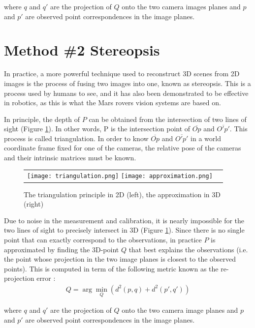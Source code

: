 \documentclass[twoside]{article}
\begin{document}
where $q$ and $q'$ are the projection of $Q$ onto the two camera images planes and $p$ and $p'$ are observed point correspondences in the image planes.
\section{Method \#2 Stereopsis}

In practice, a more powerful technique used to reconstruct 3D scenes from 2D images is the process of fusing two images into one, known as stereopsis. This is a process used by humans to see, and it has also been demonstrated to be effective in robotics, as this is what the Mars rovers vision systems are based on.

In principle, the depth of $P$ can be obtained from the intersection of two lines of sight (Figure \ref{triangle}). In other words, P is the intersection point of $\overline{Op}$ and $\overline{O'p'}$. This process is called triangulation. In order to know $\overline{Op}$ and $\overline{O'p'}$ in a  world coordinate frame fixed for one of the cameras, the relative pose of the cameras and their intrinsic matrices must be known.

\begin{figure}[h!]
  \begin{center}
	\begin{tabular}{cc}
	  \texttt{[image: triangulation.png]}
	  \texttt{[image: approximation.png]}
	\end{tabular}
  \end{center}
  \caption{The triangulation principle in 2D (left), the approximation in 3D (right)}
  \label{triangle}
\end{figure}

Due to noise in the measurement and calibration, it is nearly impossible for the two lines of sight to precisely intersect in 3D (Figure \ref{triangle}). Since there is no single point that can exactly correspond to the observations, in practice $P$ is approximated by finding the 3D-point $Q$ that best explains the observations (i.e. the point whose projection in the two image planes is closest to the observed points). This is computed in term of the following metric known as the re-projection error :
\begin{align}
Q = \arg\!\min_Q (d^2(p, q) + d^2(p', q'))
\end{align}

where $q$ and $q'$ are the projection of $Q$ onto the two camera image planes and $p$ and $p'$ are observed point correspondences in the image planes.
\end{document}
